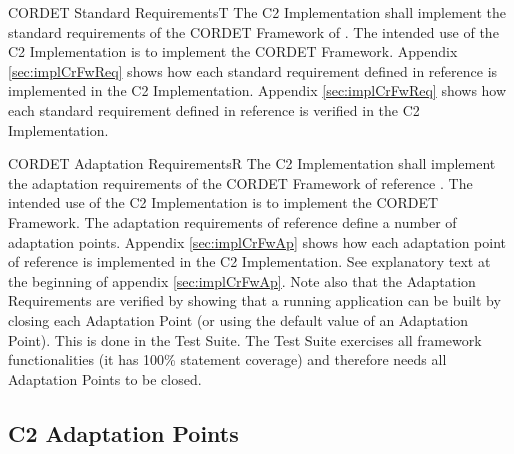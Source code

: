 \documentclass{pnp_article}
\begin{document}
\begin{fwReq}{CORDET Standard Requirements}{T}
{The C2 Implementation shall implement the standard requirements of the CORDET Framework of \cite{ref:cordetfw}.}
{The intended use of the C2 Implementation is to implement the CORDET Framework.}
{Appendix \ref{sec:implCrFwReq} shows how each standard requirement defined in reference \cite{ref:cordetfw} is implemented in the C2 Implementation.} 
{Appendix \ref{sec:implCrFwReq} shows how each standard requirement defined in reference \cite{ref:cordetfw} is verified in the C2 Implementation.} 
\end{fwReq}


\newpage
\begin{fwReq}{CORDET Adaptation Requirements}{R}
{The C2 Implementation shall implement the adaptation requirements of the CORDET Framework of reference \cite{ref:cordetfw}.}
{The intended use of the C2 Implementation is to implement the CORDET Framework.}
{The adaptation requirements of reference \cite{ref:cordetfw} define a number of adaptation points. Appendix \ref{sec:implCrFwAp} shows how each adaptation point of reference \cite{ref:cordetfw} is implemented in the C2 Implementation. } 
{See explanatory text at the beginning of appendix \ref{sec:implCrFwAp}. Note also that the Adaptation Requirements are verified by showing that a running application can be built by closing each Adaptation Point (or using the default value of an Adaptation Point). This is done in the Test Suite. The Test Suite exercises all framework functionalities (it has 100\% statement coverage) and therefore needs all Adaptation Points to be closed.}
\end{fwReq}

\subsection{C2 Adaptation Points}
\end{document}

